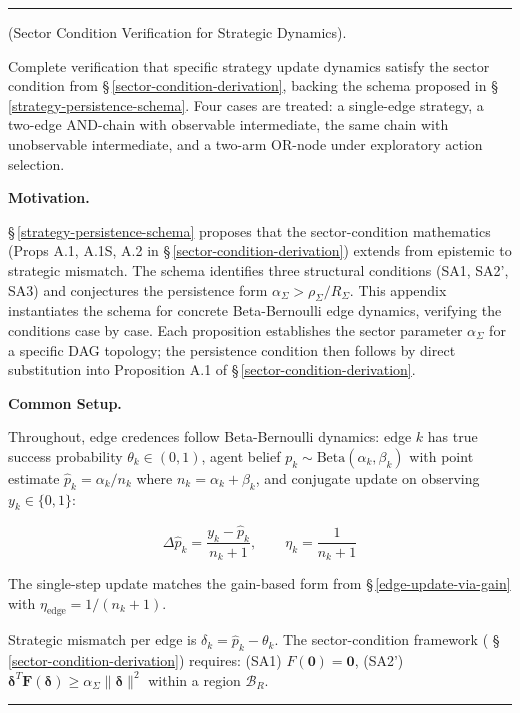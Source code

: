 \documentclass[11pt,oneside]{article}
\newcounter{claim}[section]
\renewcommand{\theclaim}{\thesection.\arabic{claim}}
\newenvironment{segment}[2]{%
  \refstepcounter{claim}%
  \bigskip\noindent\hrule\smallskip
  \noindent{\bfseries #1~\theclaim}\enskip(#2).\par\smallskip
  \noindent\ignorespaces
}{%
  \par\smallskip\noindent\hrule\bigskip
}
\newenvironment{derivation}[1][]{\begin{segment}{Derivation}{#1}}{\end{segment}}
\begin{document}
\begin{derivation}[Sector Condition Verification for Strategic Dynamics]
\label{strategic-dynamics-derivation}
Complete verification that specific strategy update dynamics satisfy the sector condition from \S\,\ref{sector-condition-derivation}, backing the schema proposed in \S\,\ref{strategy-persistence-schema}. Four cases are treated: a single-edge strategy, a two-edge AND-chain with observable intermediate, the same chain with unobservable intermediate, and a two-arm OR-node under exploratory action selection.



\medskip\noindent\textbf{Motivation.}


\S\,\ref{strategy-persistence-schema} proposes that the sector-condition mathematics (Props A.1, A.1S, A.2 in \S\,\ref{sector-condition-derivation}) extends from epistemic to strategic mismatch. The schema identifies three structural conditions (SA1, SA2', SA3) and conjectures the persistence form $\alpha_\Sigma > \rho_\Sigma / R_\Sigma$. This appendix instantiates the schema for concrete Beta-Bernoulli edge dynamics, verifying the conditions case by case. Each proposition establishes the sector parameter $\alpha_\Sigma$ for a specific DAG topology; the persistence condition then follows by direct substitution into Proposition A.1 of \S\,\ref{sector-condition-derivation}.



\medskip\noindent\textbf{Common Setup.}


Throughout, edge credences follow Beta-Bernoulli dynamics: edge $k$ has true success probability $\theta_k \in (0,1)$, agent belief $p_k \sim \text{Beta}(\alpha_k, \beta_k)$ with point estimate $\hat p_k = \alpha_k / n_k$ where $n_k = \alpha_k + \beta_k$, and conjugate update on observing $y_k \in \{0,1\}$:


$$\Delta \hat p_k = \frac{y_k - \hat p_k}{n_k + 1}, \qquad \eta_k = \frac{1}{n_k + 1}$$

The single-step update matches the gain-based form from \S\,\ref{edge-update-via-gain} with $\eta_{\text{edge}} = 1/(n_k + 1)$.

Strategic mismatch per edge is $\delta_k = \hat p_k - \theta_k$. The sector-condition framework ( \S\,\ref{sector-condition-derivation}) requires: (SA1) $F(\mathbf{0}) = \mathbf{0}$, (SA2') $\boldsymbol{\delta}^T \mathbf{F}(\boldsymbol{\delta}) \geq \alpha_\Sigma \lVert\boldsymbol{\delta}\rVert^2$ within a region $\mathcal B_R$.




\end{derivation}
\end{document}
